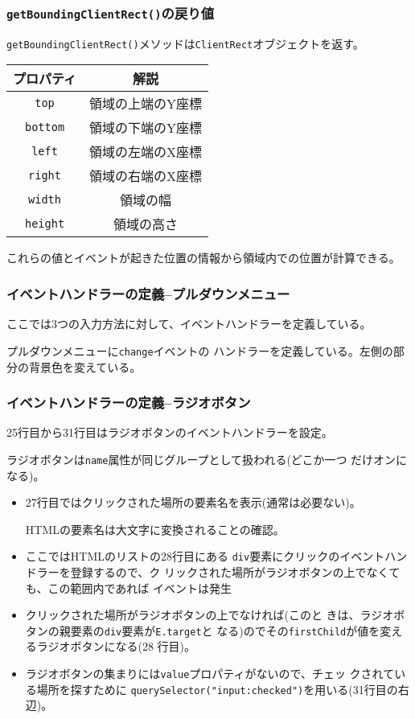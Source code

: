 \begin{frame}[containsverbatim]
\frametitle{\texttt{getBoundingClientRect()}の戻り値}
 \texttt{getBoundingClientRect()}メソッドは\texttt{ClientRect}オブジェクトを返す。
\begin{center}
\begin{tabular}{|c|c|}\hline
プロパティ&\multicolumn{1}{c|}{解説} \\\hline
 \texttt{top}&領域の上端のY座標 \\\hline
 \texttt{bottom}&領域の下端のY座標 \\\hline
 \texttt{left}& 領域の左端のX座標\\\hline
 \texttt{right}& 領域の右端のX座標\\\hline
 \texttt{width}& 領域の幅\\\hline
 \texttt{height}& 領域の高さ\\\hline
\end{tabular}
\end{center}
これらの値とイベントが起きた位置の情報から領域内での位置が計算できる。
\end{frame}
\begin{frame}[containsverbatim]
\frametitle{イベントハンドラーの定義--プルダウンメニュー}
 ここでは3つの入力方法に対して、イベントハンドラーを定義している。
 
 プルダウンメニューに\texttt{change}イベントの
       ハンドラーを定義している。左側の部分の背景色を変えている。
\end{frame}
\begin{frame}[containsverbatim]
 \frametitle{イベントハンドラーの定義--ラジオボタン}
 25行目から31行目はラジオボタンのイベントハンドラーを設定。

 ラジオボタンは\texttt{name}属性が同じグループとして扱われる(どこか一つ
 だけオンになる)。 
\end{frame}
\begin{frame}[containsverbatim]
\begin{itemize}
 \item 27行目ではクリックされた場所の要素名を表示(通常は必要ない)。
       
       HTMLの要素名は大文字に変換されることの確認。
 \item ここではHTMLのリストの28行目にある
       \texttt{div}要素にクリックのイベントハンドラーを登録するので、ク
       リックされた場所がラジオボタンの上でなくても、この範囲内であれば
       イベントは発生
 \item クリックされた場所がラジオボタンの上でなければ(このと
       きは、ラジオボタンの親要素の\texttt{div}要素が\texttt{E.target}と
       なる)のでその\texttt{firstChild}が値を変えるラジオボタンになる(28
       行目)。
 \item ラジオボタンの集まりには\texttt{value}プロパティがないので、チェッ
       クされている場所を探すために
       \texttt{querySelector("input:checked")}を用いる(31行目の右辺)。
\end{itemize}
\end{frame}
